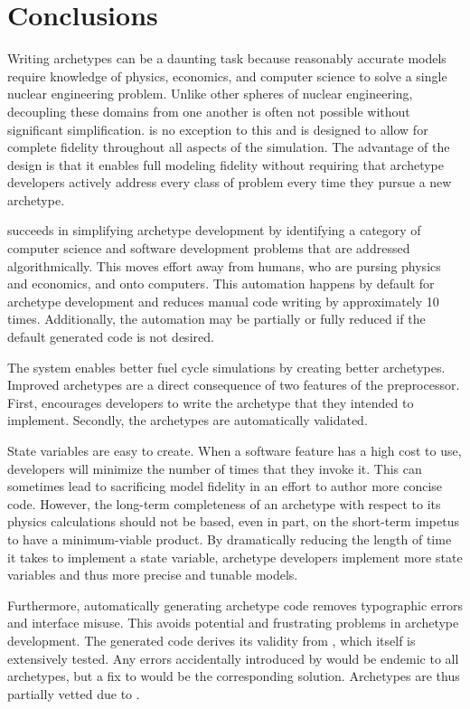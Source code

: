 \section{Conclusions}
\label{sec-conc}

Writing archetypes can be a daunting task because reasonably accurate models 
require knowledge of physics, economics, and computer science to solve a single nuclear engineering 
problem.  Unlike other spheres of nuclear engineering, decoupling these domains from
one another is often not possible without significant simplification. \cyclus is 
no exception to this and is designed to allow for complete fidelity throughout 
all aspects of the simulation. The advantage of the \cyclus design is that it 
enables full modeling fidelity without requiring that archetype developers actively 
address every class of problem every time they pursue a new archetype.

\Cyclus succeeds in simplifying archetype development by identifying a category 
of computer science and software development problems that are addressed 
algorithmically. This moves effort away from humans, who are pursing physics and
economics, and onto computers. This automation happens by default for
archetype development and reduces manual code writing by approximately
10 times.
Additionally, the automation may be partially or fully reduced 
if the default generated code is not desired. 

The \cyclus system enables better fuel cycle simulations by creating better 
archetypes.  Improved archetypes are a direct consequence of two features of the preprocessor. First, 
\cyclus encourages developers to write the archetype
that they intended to implement. Secondly, the archetypes are automatically
validated.

State variables are easy to create. When a software feature has a high cost to use,
developers will minimize the number of times that they invoke it. This can 
sometimes lead to sacrificing model fidelity in an effort to author more concise
code. However, the long-term completeness of an archetype
with respect to its physics calculations should not be based, even in part, on the
short-term impetus to have a minimum-viable product. By dramatically reducing the 
length of time it takes to implement a state variable, archetype developers implement
more state variables and thus more precise and tunable models.

Furthermore, automatically generating archetype code removes typographic errors and 
\cyclus interface misuse. This avoids potential and frustrating problems in 
archetype development. The 
generated code derives its validity from \cycpp, which itself is extensively 
tested. Any errors accidentally introduced by \cycpp would be endemic to all archetypes, 
but a fix to \cycpp would be the corresponding solution. Archetypes are thus 
partially vetted due to \cycpp.

